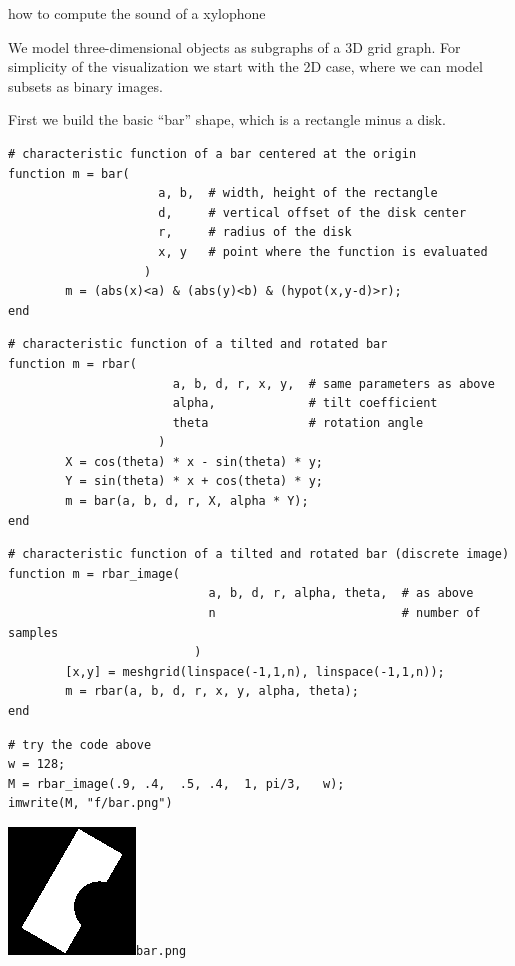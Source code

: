 \documentclass[a4paper,11pt]{article}
\begin{document}
{\Large how to compute the sound of a xylophone}

%

We model three-dimensional objects as subgraphs of a 3D grid graph.
For simplicity of the visualization we start with the 2D case, where we can
model subsets as binary images.


First we build the basic ``bar'' shape, which is a rectangle minus a disk.

\begin{verbatim}
# characteristic function of a bar centered at the origin
function m = bar(
                     a, b,  # width, height of the rectangle
                     d,     # vertical offset of the disk center
                     r,     # radius of the disk
                     x, y   # point where the function is evaluated
                   )
        m = (abs(x)<a) & (abs(y)<b) & (hypot(x,y-d)>r);
end
\end{verbatim}

\begin{verbatim}
# characteristic function of a tilted and rotated bar
function m = rbar(
                       a, b, d, r, x, y,  # same parameters as above
                       alpha,             # tilt coefficient
                       theta              # rotation angle
                     )
        X = cos(theta) * x - sin(theta) * y;
        Y = sin(theta) * x + cos(theta) * y;
        m = bar(a, b, d, r, X, alpha * Y);
end
\end{verbatim}

\begin{verbatim}
# characteristic function of a tilted and rotated bar (discrete image)
function m = rbar_image(
                            a, b, d, r, alpha, theta,  # as above
                            n                          # number of samples
                          )
        [x,y] = meshgrid(linspace(-1,1,n), linspace(-1,1,n));
        m = rbar(a, b, d, r, x, y, alpha, theta);
end
\end{verbatim}

\begin{verbatim}
# try the code above
w = 128;
M = rbar_image(.9, .4,  .5, .4,  1, pi/3,   w);
imwrite(M, "f/bar.png")
\end{verbatim}

\includegraphics{f/bar.png}\verb+bar.png+
\end{document}
